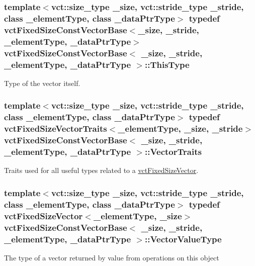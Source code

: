\subsubsection[{This\+Type}]{\setlength{\rightskip}{0pt plus 5cm}template$<$vct\+::size\+\_\+type \+\_\+size, vct\+::stride\+\_\+type \+\_\+stride, class \+\_\+element\+Type, class \+\_\+data\+Ptr\+Type$>$ typedef {\bf vct\+Fixed\+Size\+Const\+Vector\+Base}$<$\+\_\+size, \+\_\+stride, \+\_\+element\+Type, \+\_\+data\+Ptr\+Type$>$ {\bf vct\+Fixed\+Size\+Const\+Vector\+Base}$<$ \+\_\+size, \+\_\+stride, \+\_\+element\+Type, \+\_\+data\+Ptr\+Type $>$\+::{\bf This\+Type}}\label{classvct_fixed_size_const_vector_base_a071063bc4fa43112cc287b2dbef53180}
Type of the vector itself. \hypertarget{classvct_fixed_size_const_vector_base_ac47f6db624303dee621bca2ec51aa75e}{}
\subsubsection[{Vector\+Traits}]{\setlength{\rightskip}{0pt plus 5cm}template$<$vct\+::size\+\_\+type \+\_\+size, vct\+::stride\+\_\+type \+\_\+stride, class \+\_\+element\+Type, class \+\_\+data\+Ptr\+Type$>$ typedef {\bf vct\+Fixed\+Size\+Vector\+Traits}$<$\+\_\+element\+Type, \+\_\+size, \+\_\+stride$>$ {\bf vct\+Fixed\+Size\+Const\+Vector\+Base}$<$ \+\_\+size, \+\_\+stride, \+\_\+element\+Type, \+\_\+data\+Ptr\+Type $>$\+::{\bf Vector\+Traits}}\label{classvct_fixed_size_const_vector_base_ac47f6db624303dee621bca2ec51aa75e}
Traits used for all useful types related to a \hyperlink{classvct_fixed_size_vector}{vct\+Fixed\+Size\+Vector}. \hypertarget{classvct_fixed_size_const_vector_base_a4de94a741a6bb9046e05754c32475ecd}{}
\subsubsection[{Vector\+Value\+Type}]{\setlength{\rightskip}{0pt plus 5cm}template$<$vct\+::size\+\_\+type \+\_\+size, vct\+::stride\+\_\+type \+\_\+stride, class \+\_\+element\+Type, class \+\_\+data\+Ptr\+Type$>$ typedef {\bf vct\+Fixed\+Size\+Vector}$<$\+\_\+element\+Type, \+\_\+size$>$ {\bf vct\+Fixed\+Size\+Const\+Vector\+Base}$<$ \+\_\+size, \+\_\+stride, \+\_\+element\+Type, \+\_\+data\+Ptr\+Type $>$\+::{\bf Vector\+Value\+Type}}\label{classvct_fixed_size_const_vector_base_a4de94a741a6bb9046e05754c32475ecd}
The type of a vector returned by value from operations on this object 

